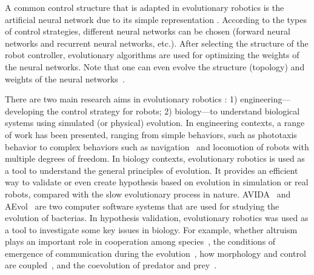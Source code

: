 A common control structure that is adapted in evolutionary robotics is the artificial neural network due to its simple representation \cite{Floreano_1997, Floreano2008:NN}. According to the types of control strategies, different neural networks can be chosen (forward neural networks and recurrent neural networks, etc.). After selecting the structure of the robot controller, evolutionary algorithms are used for optimizing the weights of the neural networks. Note that one can even evolve the structure (topology) and weights of the neural networks~\cite{Kenneth2002}. 

There are two main research aims in evolutionary robotics \cite{Doncieux2015}: 1) engineering---developing the control strategy for robots; 2) biology---to understand biological systems using simulated (or physical) evolution. In engineering contexts, a range of work has been presented, ranging from simple behaviors, such as phototaxis behavior \cite{Nelson2009345} to complex behaviors such as navigation~\cite{Floreano1996} and locomotion \cite{nolfi2000evolutionary} of robots with multiple degrees of freedom. In biology contexts, evolutionary robotics is used as a tool to understand the general principles of evolution. It provides an efficient way to validate or even create hypothesis based on evolution in simulation or real robots, compared with the slow evolutionary process in nature. AVIDA~\cite{Bryson2013} and AEvol~\cite{Batut2013} are two computer software systems that are used for studying the evolution of bacterias. In hypothesis validation, evolutionary robotics was used as a tool to investigate some key issues in biology. For example, whether altruism plays an important role in cooperation among species~\cite{montanier:inria2011,Waibel2011}, the conditions of emergence of communication during the evolution~\cite{Floreano2007514}, how morphology and control are coupled~\cite{Auerbach:PLoS:2014}, and the coevolution of predator and prey~\cite{Cliff_1995, Floreano_1998}. 

